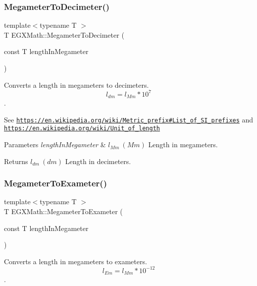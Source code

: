 \subsubsection{\texorpdfstring{Megameter\+To\+Decimeter()}{MegameterToDecimeter()}}
{\footnotesize\ttfamily template$<$typename T $>$ \\
T E\+G\+X\+Math\+::\+Megameter\+To\+Decimeter (\begin{DoxyParamCaption}\item[{const T}]{length\+In\+Megameter }\end{DoxyParamCaption})}



Converts a length in megameters to decimeters. \[ l_{dm}=l_{Mm} * 10^{7} \]. 

See \href{https://en.wikipedia.org/wiki/Metric_prefix#List_of_SI_prefixes}{\tt https\+://en.\+wikipedia.\+org/wiki/\+Metric\+\_\+prefix\#\+List\+\_\+of\+\_\+\+S\+I\+\_\+prefixes} and \href{https://en.wikipedia.org/wiki/Unit_of_length}{\tt https\+://en.\+wikipedia.\+org/wiki/\+Unit\+\_\+of\+\_\+length} 
\begin{DoxyParams}{Parameters}
{\em length\+In\+Megameter} & $ l_{Mm}\ (Mm)$ Length in megameters. \\
\hline
\end{DoxyParams}
\begin{DoxyReturn}{Returns}
$ l_{dm}\ (dm)$ Length in decimeters. 
\end{DoxyReturn}
\mbox{\label{group___e_g_x_math-_conversions-_length_conversions-_s_i-_megameter-_s_i_ga30aed22a379d3215a2d660a4219c6936}} 
\subsubsection{\texorpdfstring{Megameter\+To\+Exameter()}{MegameterToExameter()}}
{\footnotesize\ttfamily template$<$typename T $>$ \\
T E\+G\+X\+Math\+::\+Megameter\+To\+Exameter (\begin{DoxyParamCaption}\item[{const T}]{length\+In\+Megameter }\end{DoxyParamCaption})}



Converts a length in megameters to exameters. \[ l_{Em}=l_{Mm} * 10^{-12} \]. 

